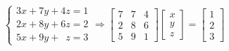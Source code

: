 \begin{prob}
\label{prob17}
\begin{equation*}
      \begin{cases}
                3x+7y+4z = 1\\
                2x+8y+6z = 2 \\
                5x+9y+\phantom{1}z=3
            \end{cases}
            \Rightarrow
            \begin{bmatrix}
                7 & 7 & 4\\
                2 & 8 & 6\\
                5 & 9 & 1
            \end{bmatrix}
            \begin{bmatrix}
                x \\
                y \\
                z
            \end{bmatrix}
            =
            \begin{bmatrix}
                1 \\
                2 \\
                3
            \end{bmatrix}
\end{equation*}
\end{prob}